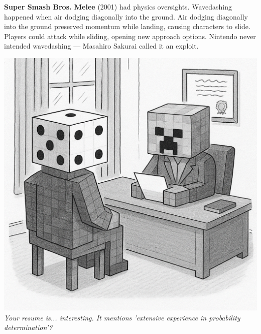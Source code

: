 \textbf{Super Smash Bros. Melee} (2001) had physics oversights. Wavedashing happened when air dodging diagonally into the ground. Air dodging diagonally into the ground preserved momentum while landing, causing characters to slide. Players could attack while sliding, opening new approach options. Nintendo never intended wavedashing — Masahiro Sakurai called it an exploit. 

\vspace{2em}
\begin{center}
    \includegraphics[height=20\baselineskip]{22_MinecraftCreeper/ChatGPT Image Apr 21, 2025, 08_04_30 PM.png}\\
    {\small\textit{Your resume is... interesting. It mentions 'extensive experience in probability determination'?}}
\end{center}
